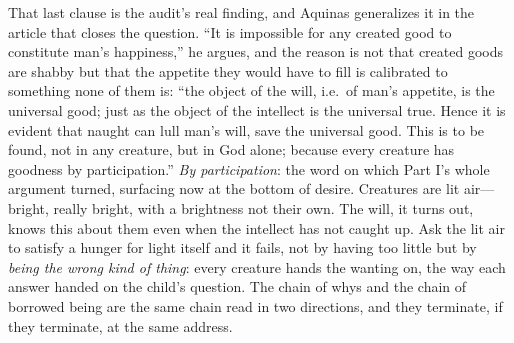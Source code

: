 That last clause is the audit's real finding, and Aquinas generalizes it in the article that closes the question. ``It is impossible for any created good to constitute man's happiness,'' he argues, and the reason is not that created goods are shabby but that the appetite they would have to fill is calibrated to something none of them is: ``the object of the will, i.e.\ of man's appetite, is the universal good; just as the object of the intellect is the universal true. Hence it is evident that naught can lull man's will, save the universal good. This is to be found, not in any creature, but in God alone; because every creature has goodness by participation.'' \emph{By participation}: the word on which Part I's whole argument turned, surfacing now at the bottom of desire. Creatures are lit air---bright, really bright, with a brightness not their own. The will, it turns out, knows this about them even when the intellect has not caught up. Ask the lit air to satisfy a hunger for light itself and it fails, not by having too little but by \emph{being the wrong kind of thing}: every creature hands the wanting on, the way each answer handed on the child's question. The chain of whys and the chain of borrowed being are the same chain read in two directions, and they terminate, if they terminate, at the same address.

